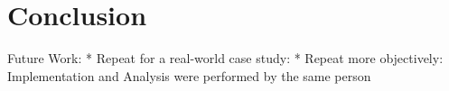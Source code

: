 \section{Conclusion}\label{sec:conclusion}

Future Work:
* Repeat for a real-world case study: \cite{Runeson2012, Setzke2020, Goldkuhl2019, Myers1997}
* Repeat more objectively: Implementation and Analysis were performed by the same person

